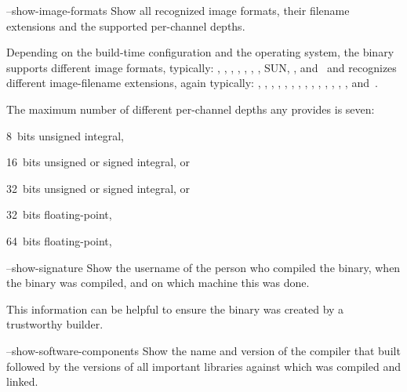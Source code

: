 \begin{codelist}
\begin{exemplar}
    \caption[Sample  configuration.]%
            {\label{ex:opencl-config}%
              A sample  configuration as detected by \App.}
  \end{exemplar}


  \label{opt:show-image-formats}%
\item[--show-image-formats]\itemend
  Show all recognized image formats, their filename extensions and the supported per-channel
  depths.

  Depending on the build-time configuration and the operating system, the binary supports
  different image formats, typically: , , ,
  , , , , SUN, ,
  and~ and recognizes different image-filename extensions, again typically:
  , , , , ,
  , , , , ,
  , , , , and~.

  The maximum number of different per-channel depths any \appcmd{} provides is seven:
  \begin{compactitemize}
  \item 8~bits unsigned integral, 
  \item 16~bits unsigned or signed integral,  or 
  \item 32~bits unsigned or signed integral,  or 
  \item 32~bits floating-point, 
  \item 64~bits floating-point, 
  \end{compactitemize}


  \label{opt:show-signature}%
\item[--show-signature]\itemend
  Show the username of the person who compiled the binary, when the binary was compiled, and on
  which machine this was done.

  This information can be helpful to ensure the binary was created by a trustworthy builder.


  \label{opt:show-software-components}%
\item[--show-software-components]\itemend
  Show the name and version of the compiler that built \App{} followed by the versions of all
  important libraries against which \App{} was compiled and linked.


\end{codelist}
